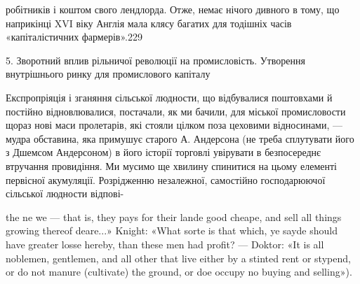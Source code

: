 робітників і коштом свого лендлорда. Отже, немає нічого дивного
в тому, що наприкінці XVI віку Англія мала клясу багатих
для тодішніх часів «капіталістичних фармерів».229

5. Зворотний вплив рільничої революції на промисловість.
Утворення внутрішнього ринку для промислового капіталу

Експропріяція і зганяння сільської людности, що відбувалися
поштовхами й постійно відновлювалися, постачали, як ми бачили,
для міської промисловости щораз нові маси пролетарів, які
стояли цілком поза цеховими відносинами, — мудра обставина,
яка примушує старого А. Андерсона (не треба сплутувати його
з Дшемсом Андерсоном) в його історії торговлі увірувати в безпосереднє
втручання провидіння. Ми мусимо ще хвилину спинитися
на цьому елементі первісної акумуляції. Розрідженню незалежної,
самостійно господарюючої сільської людности відпові-

the ne we — that is, they pays for their lande good cheape, and sell all things
growing thereof deare...» Knight: «What sorte is that which, ye sayde
should have greater losse hereby, than these men had profit? — Doktor:
«It is all noblemen, gentlemen, and all other that live either by a stinted
rent or stypend, or do not manure (cultivate) the ground, or doe occupy no
buying and selling»).

